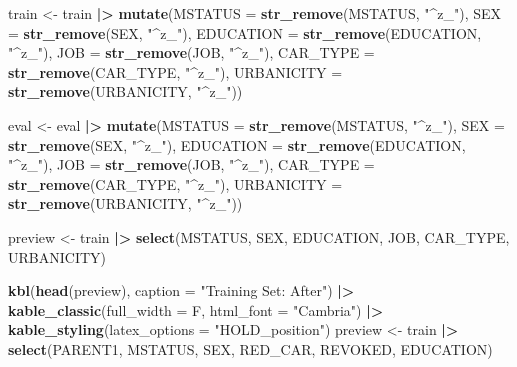 \documentclass[
]{article}
\newenvironment{Shaded}{\begin{snugshade}}{\end{snugshade}}
\newcommand{\AttributeTok}[1]{\textcolor[rgb]{0.13,0.29,0.53}{#1}}
\newcommand{\FunctionTok}[1]{\textcolor[rgb]{0.13,0.29,0.53}{\textbf{#1}}}
\newcommand{\NormalTok}[1]{#1}
\newcommand{\OtherTok}[1]{\textcolor[rgb]{0.56,0.35,0.01}{#1}}
\newcommand{\SpecialCharTok}[1]{\textcolor[rgb]{0.81,0.36,0.00}{\textbf{#1}}}
\newcommand{\StringTok}[1]{\textcolor[rgb]{0.31,0.60,0.02}{#1}}
\begin{document}
\begin{Shaded}
\begin{Highlighting}[]
\NormalTok{train }\OtherTok{\textless{}{-}}
\NormalTok{  train }\SpecialCharTok{|\textgreater{}}
  \FunctionTok{mutate}\NormalTok{(}\AttributeTok{MSTATUS =} \FunctionTok{str\_remove}\NormalTok{(MSTATUS, }\StringTok{"\^{}z\_"}\NormalTok{),}
         \AttributeTok{SEX =} \FunctionTok{str\_remove}\NormalTok{(SEX, }\StringTok{"\^{}z\_"}\NormalTok{),}
         \AttributeTok{EDUCATION =} \FunctionTok{str\_remove}\NormalTok{(EDUCATION, }\StringTok{"\^{}z\_"}\NormalTok{),}
         \AttributeTok{JOB =} \FunctionTok{str\_remove}\NormalTok{(JOB, }\StringTok{"\^{}z\_"}\NormalTok{),}
         \AttributeTok{CAR\_TYPE =} \FunctionTok{str\_remove}\NormalTok{(CAR\_TYPE, }\StringTok{"\^{}z\_"}\NormalTok{),}
         \AttributeTok{URBANICITY =} \FunctionTok{str\_remove}\NormalTok{(URBANICITY, }\StringTok{"\^{}z\_"}\NormalTok{))}

\NormalTok{eval }\OtherTok{\textless{}{-}}
\NormalTok{  eval }\SpecialCharTok{|\textgreater{}}
  \FunctionTok{mutate}\NormalTok{(}\AttributeTok{MSTATUS =} \FunctionTok{str\_remove}\NormalTok{(MSTATUS, }\StringTok{"\^{}z\_"}\NormalTok{),}
         \AttributeTok{SEX =} \FunctionTok{str\_remove}\NormalTok{(SEX, }\StringTok{"\^{}z\_"}\NormalTok{),}
         \AttributeTok{EDUCATION =} \FunctionTok{str\_remove}\NormalTok{(EDUCATION, }\StringTok{"\^{}z\_"}\NormalTok{),}
         \AttributeTok{JOB =} \FunctionTok{str\_remove}\NormalTok{(JOB, }\StringTok{"\^{}z\_"}\NormalTok{),}
         \AttributeTok{CAR\_TYPE =} \FunctionTok{str\_remove}\NormalTok{(CAR\_TYPE, }\StringTok{"\^{}z\_"}\NormalTok{),}
         \AttributeTok{URBANICITY =} \FunctionTok{str\_remove}\NormalTok{(URBANICITY, }\StringTok{"\^{}z\_"}\NormalTok{))}

\NormalTok{preview }\OtherTok{\textless{}{-}}
\NormalTok{  train }\SpecialCharTok{|\textgreater{}}
  \FunctionTok{select}\NormalTok{(MSTATUS, SEX, EDUCATION, JOB, CAR\_TYPE, URBANICITY)}

\FunctionTok{kbl}\NormalTok{(}\FunctionTok{head}\NormalTok{(preview), }\AttributeTok{caption =} \StringTok{"Training Set: After"}\NormalTok{) }\SpecialCharTok{|\textgreater{}}
  \FunctionTok{kable\_classic}\NormalTok{(}\AttributeTok{full\_width =}\NormalTok{ F, }\AttributeTok{html\_font =} \StringTok{"Cambria"}\NormalTok{) }\SpecialCharTok{|\textgreater{}}
  \FunctionTok{kable\_styling}\NormalTok{(}\AttributeTok{latex\_options =} \StringTok{"HOLD\_position"}\NormalTok{) }
\NormalTok{preview }\OtherTok{\textless{}{-}}
\NormalTok{  train }\SpecialCharTok{|\textgreater{}}
  \FunctionTok{select}\NormalTok{(PARENT1, MSTATUS, SEX, RED\_CAR, REVOKED, EDUCATION)}


\end{Highlighting}
\end{Shaded}
\end{document}
